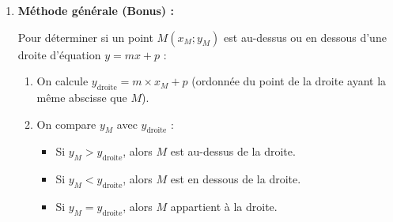 \begin{enumerate}
			\item \textbf{Méthode générale (Bonus) :}

			      Pour déterminer si un point $M(x_M;y_M)$ est au-dessus ou en dessous d'une droite d'équation $y = mx + p$ :
			      \begin{enumerate}
				      \item On calcule $y_{\text{droite}} = m \times x_M + p$ (ordonnée du point de la droite ayant la même abscisse que $M$).
				      \item On compare $y_M$ avec $y_{\text{droite}}$ :
				            \begin{itemize}
					            \item Si $y_M > y_{\text{droite}}$, alors $M$ est au-dessus de la droite.
					            \item Si $y_M < y_{\text{droite}}$, alors $M$ est en dessous de la droite.
					            \item Si $y_M = y_{\text{droite}}$, alors $M$ appartient à la droite.
				            \end{itemize}
			      \end{enumerate}
		\end{enumerate}
